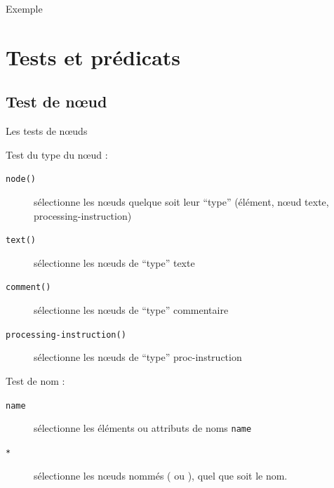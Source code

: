 \begin{frame}[allowframebreaks]{Exemple}
\begin{center}
\end{center}

\end{frame}

\section{Tests et prédicats}


\subsection{Test de n{\oe}ud}

\begin{frame}{Les tests de n{\oe}uds}

Test du type du n{\oe}ud :
\begin{description}
\item[\verb?node()?] sélectionne les nœuds quelque soit leur ``type'' (élément, n{\oe}ud texte, processing-instruction)
\item[\verb?text()?] sélectionne les n{\oe}uds de ``type'' texte
\item[\verb?comment()?] sélectionne les nœuds de ``type'' commentaire
\item[\verb?processing-instruction()?] sélectionne les nœuds de ``type'' proc-instruction
\end{description}

\medskip

Test de nom :
\begin{description}
\item[\verb?name?] sélectionne les éléments ou attributs de noms \texttt{name}
\item[\verb?*?] sélectionne les n{\oe}uds \alert{nommés} ( ou ), quel que soit le nom.
\end{description}

\end{frame}

